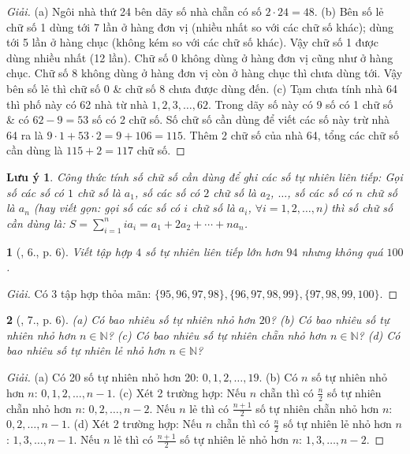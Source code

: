 \documentclass{article}
\newtheorem{baitoan}{}
\newtheorem{luuy}{Lưu ý}
\begin{document}
\begin{proof}[Giải]
	(a) Ngôi nhà thứ 24 bên dãy số nhà chẵn có số $2\cdot24 = 48$. (b) Bên số lẻ chữ số 1 dùng tới 7 lần ở hàng đơn vị (nhiều nhất so với các chữ số khác); dùng tới 5 lần ở hàng chục (không kém so với các chữ số khác). Vậy chữ số 1 được dùng nhiều nhất (12 lần). Chữ số 0 không dùng ở hàng đơn vị cũng như ở hàng chục. Chữ số 8 không dùng ở hàng đơn vị còn ở hàng chục thì chưa dùng tới. Vậy bên số lẻ thì chữ số 0 \& chữ số 8 chưa được dùng đến. (c) Tạm chưa tính nhà 64 thì phố này có 62 nhà từ nhà $1,2,3,\ldots,62$. Trong dãy số này có 9 số có 1 chữ số \& có $62 - 9 = 53$ số có 2 chữ số. Số chữ số cần dùng để viết các số này trừ nhà 64 ra là $9\cdot1 + 53\cdot2 = 9 + 106 = 115$. Thêm 2 chữ số của nhà 64, tổng các chữ số cần dùng là $115 + 2 = 117$ chữ số.
\end{proof}

\begin{luuy}
	Công thức tính số chữ số cần dùng để ghi các số tự nhiên liên tiếp: Gọi số các số có $1$ chữ số là $a_1$, số các số có $2$ chữ số là $a_2$, $\ldots$,  số các số có $n$ chữ số là $a_n$ (hay viết gọn: gọi số các số có $i$ chữ số là $a_i$, $\forall i = 1,2,\ldots,n$) thì số chữ số cần dùng là: $S = \sum_{i=1}^n ia_i = a_1 + 2a_2 + \cdots + na_n$.
\end{luuy}

\begin{baitoan}[\cite{Tuyen_Toan_6}, 6., p. 6]
	Viết tập hợp $4$ số tự nhiên liên tiếp lớn hơn $94$ nhưng không quá $100$.
\end{baitoan}

\begin{proof}[Giải]
	Có 3 tập hợp thỏa mãn: $\{95,96,97,98\},\{96,97,98,99\},\{97,98,99,100\}$.
\end{proof}

\begin{baitoan}[\cite{Tuyen_Toan_6}, 7., p. 6]
	(a) Có bao nhiêu số tự nhiên nhỏ hơn $20$? (b) Có bao nhiêu số tự nhiên nhỏ hơn $n\in\mathbb{N}$? (c) Có bao nhiêu số tự nhiên chẵn nhỏ hơn $n\in\mathbb{N}$? (d) Có bao nhiêu số tự nhiên lẻ nhỏ hơn $n\in\mathbb{N}$?
\end{baitoan}

\begin{proof}[Giải]
	(a) Có 20 số tự nhiên nhỏ hơn 20: $0,1,2,\ldots,19$. (b) Có $n$ số tự nhiên nhỏ hơn $n$: $0,1,2,\ldots,n - 1$. (c) Xét 2 trường hợp: Nếu $n$ chẵn thì có $\frac{n}{2}$ số tự nhiên chẵn nhỏ hơn $n$: $0,2,\ldots,n - 2$. Nếu $n$ lẻ thì có $\frac{n + 1}{2}$ số tự nhiên chẵn nhỏ hơn $n$: $0,2,\ldots,n - 1$. (d) Xét 2 trường hợp: Nếu $n$ chẵn thì có $\frac{n}{2}$ số tự nhiên lẻ nhỏ hơn $n$: $1,3,\ldots,n - 1$. Nếu $n$ lẻ thì có $\frac{n + 1}{2}$ số tự nhiên lẻ nhỏ hơn $n$: $1,3,\ldots,n - 2$.
\end{proof}
\end{document}
